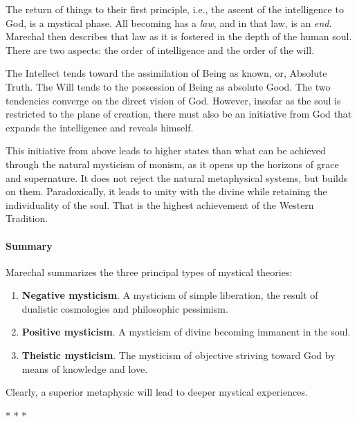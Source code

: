 The return of things to their first principle, i.e., the ascent of the intelligence to God, is a mystical phase. All becoming has a \emph{law}, and in that law, is an \emph{end}. Marechal then describes that law as it is fostered in the depth of the human soul. There are two aspects: the order of intelligence and the order of the will.

The Intellect tends toward the assimilation of Being as known, or, Absolute Truth. The Will tends to the possession of Being as absolute Good. The two tendencies converge on the direct vision of God. However, insofar as the soul is restricted to the plane of creation, there must also be an initiative from God that expands the intelligence and reveals himself.

This initiative from above leads to higher states than what can be achieved through the natural mysticism of monism, as it opens up the horizons of grace and supernature. It does not reject the natural metaphysical systems, but builds on them. Paradoxically, it leads to unity with the divine while retaining the individuality of the soul. That is the highest achievement of the Western Tradition.

\paragraph{Summary}


Marechal summarizes the three principal types of mystical theories:

\begin{enumerate}


\item \textbf{Negative mysticism}. A mysticism of simple liberation, the result of dualistic cosmologies and philosophic pessimism.

\item \textbf{Positive mysticism}. A mysticism of divine becoming immanent in the soul.

\item \textbf{Theistic mysticism}. The mysticism of objective striving toward God by means of knowledge and love.
\end{enumerate}


Clearly, a superior metaphysic will lead to deeper mystical experiences.



\begin{center}* * *\end{center}

